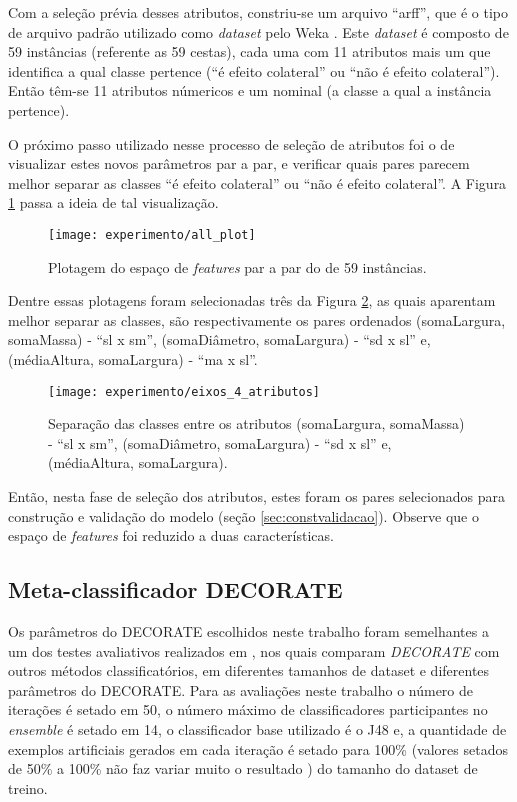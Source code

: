 Com a seleção prévia desses atributos, constriu-se um arquivo ``arff'', que é o tipo de arquivo padrão utilizado como \textit{dataset} pelo Weka \cite{Hall:2009}. Este \textit{dataset} é composto de 59 instâncias (referente as 59 cestas), cada uma com 11 atributos mais um que identifica a qual classe pertence (``é efeito colateral'' ou ``não é efeito colateral''). Então têm-se 11 atributos númericos e um nominal (a classe a qual a instância pertence).

O próximo passo utilizado nesse processo de seleção de atributos foi o de visualizar estes novos parâmetros par a par, e verificar quais pares parecem melhor separar as classes ``é efeito colateral'' ou ``não é efeito colateral''. A Figura \ref{fig:plotall1} passa a ideia de tal visualização. 

\begin{figure}[!htb] \centering 
  \centering
  \texttt{[image: experimento/all\_plot]} 
  \caption{Plotagem do espaço de \textit{features} par a par do  de 59 instâncias.} 
  \label{fig:plotall1}
\end{figure}

Dentre essas plotagens foram selecionadas três da Figura \ref{fig:eixos_4_atributos}, as quais aparentam melhor separar as classes, são respectivamente os pares ordenados (somaLargura, somaMassa) - ``sl x sm'', (somaDiâmetro, somaLargura) - ``sd x sl'' e, (médiaAltura, somaLargura) - ``ma x sl''.

\begin{figure}[!htb] \centering 
  \centering
  \texttt{[image: experimento/eixos\_4\_atributos]} 
  \caption{Separação das classes entre os atributos (somaLargura, somaMassa) - ``sl x sm'', (somaDiâmetro, somaLargura) - ``sd x sl'' e, (médiaAltura, somaLargura).} 
  \label{fig:eixos_4_atributos}
\end{figure}

Então, nesta fase de seleção dos atributos, estes foram os pares selecionados para construção e validação do modelo (seção \ref{sec:constvalidacao}). Observe que o espaço de \textit{features} foi reduzido a duas características.

\subsection{Meta-classificador DECORATE}
Os parâmetros do DECORATE escolhidos neste trabalho foram semelhantes a um dos testes avaliativos realizados em \cite{Melville:2004}, nos quais comparam \textit{DECORATE} com outros métodos classificatórios, em diferentes tamanhos de dataset e diferentes parâmetros do DECORATE. Para as avaliações neste trabalho o número de iterações é setado em 50, o número máximo de classificadores participantes no \textit{ensemble} é setado em 14, o classificador base utilizado é o J48 e, a quantidade de exemplos artificiais gerados em cada iteração é setado para 100\% (valores setados de 50\% a 100\% não faz variar muito o resultado \cite{Melville:2004}) do tamanho do dataset de treino.

